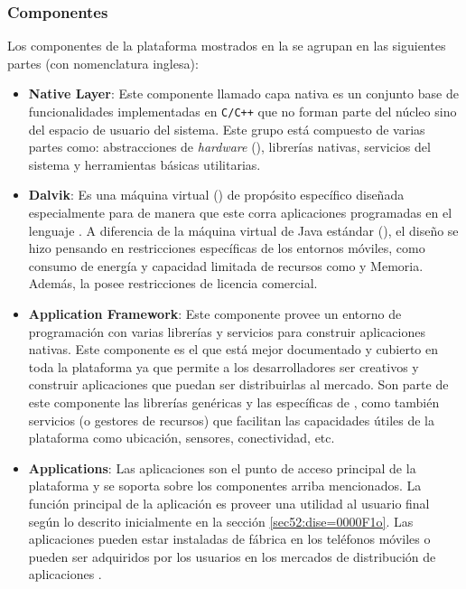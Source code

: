 \subsubsection{Componentes}

Los componentes de la plataforma mostrados en la 
se agrupan en las siguientes partes \cite{Gargenta2014} (con nomenclatura
inglesa):
\begin{itemize}
\item \textbf{Native Layer}: Este componente llamado capa nativa es un conjunto
base de funcionalidades implementadas en \texttt{C/C++} que no forman
parte del núcleo sino del espacio de usuario del sistema. Este grupo
está compuesto de varias partes como: abstracciones de \emph{hardware}
(), librerías nativas, servicios del sistema y herramientas
básicas utilitarias.
\item \textbf{Dalvik}: Es una máquina virtual () de propósito
específico diseñada especialmente para  de manera que
este corra aplicaciones programadas en el lenguaje  \cite{Ehringer2010}.
A diferencia de la máquina virtual de Java estándar (),
el diseño se hizo pensando en restricciones específicas de los entornos
móviles, como consumo de energía y capacidad limitada de recursos
como  y Memoria. Además, la  posee restricciones
de licencia comercial.
\item \textbf{Application Framework}: Este componente provee un entorno
de programación con varias librerías y servicios para construir aplicaciones
nativas. Este componente es el que está mejor documentado y cubierto
en toda la plataforma ya que permite a los desarrolladores ser creativos
y construir aplicaciones que puedan ser distribuirlas al mercado.
Son parte de este componente las librerías  genéricas
y las específicas de  \cite{OHA2008r}, como también
servicios (o gestores de recursos) que facilitan las capacidades útiles
de la plataforma como ubicación, sensores, conectividad, etc. 
\item \textbf{Applications}: Las aplicaciones son el punto de acceso principal
de la plataforma y se soporta sobre los componentes arriba mencionados.
La función principal de la aplicación es proveer una utilidad al usuario
final según lo descrito inicialmente en la sección \ref{sec52:dise=0000F1o}.
Las aplicaciones pueden estar instaladas de fábrica en los teléfonos
móviles o pueden ser adquiridos por los usuarios en los mercados de
distribución de aplicaciones .
\end{itemize}

